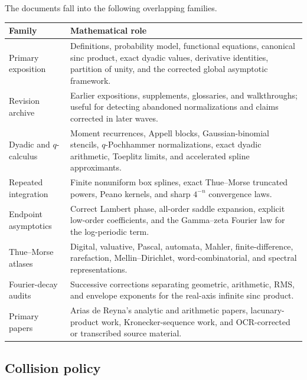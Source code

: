 \documentclass[11pt]{article}
\numberwithin{equation}{section}
\theoremstyle{definition}
\theoremstyle{remark}
\begin{document}
The documents fall into the following overlapping families.
\begin{longtable}{@{}p{}p{}@{}}
\toprule
Family & Mathematical role \\
\midrule
\endhead
Primary exposition & Definitions, probability model, functional equations,
canonical sinc product, exact dyadic values, derivative identities, partition of
unity, and the corrected global asymptotic framework. \\
Revision archive & Earlier expositions, supplements, glossaries, and walkthroughs;
useful for detecting abandoned normalizations and claims corrected in later waves. \\
Dyadic and $q$-calculus & Moment recurrences, Appell blocks, Gaussian-binomial
stencils, $q$-Pochhammer normalizations, exact dyadic arithmetic, Toeplitz limits,
and accelerated spline approximants. \\
Repeated integration & Finite nonuniform box splines, exact Thue--Morse truncated
powers, Peano kernels, and sharp $4^{-n}$ convergence laws. \\
Endpoint asymptotics & Correct Lambert phase, all-order saddle expansion, explicit
low-order coefficients, and the Gamma--zeta Fourier law for the log-periodic term. \\
Thue--Morse atlases & Digital, valuative, Pascal, automata, Mahler, finite-difference,
rarefaction, Mellin--Dirichlet, word-combinatorial, and spectral representations. \\
Fourier-decay audits & Successive corrections separating geometric, arithmetic,
RMS, and envelope exponents for the real-axis infinite sinc product. \\
Primary papers & Arias de Reyna's analytic and arithmetic papers, lacunary-product
work, Kronecker-sequence work, and OCR-corrected or transcribed source material. \\
\bottomrule
\end{longtable}

\subsection{Collision policy}
\end{document}
